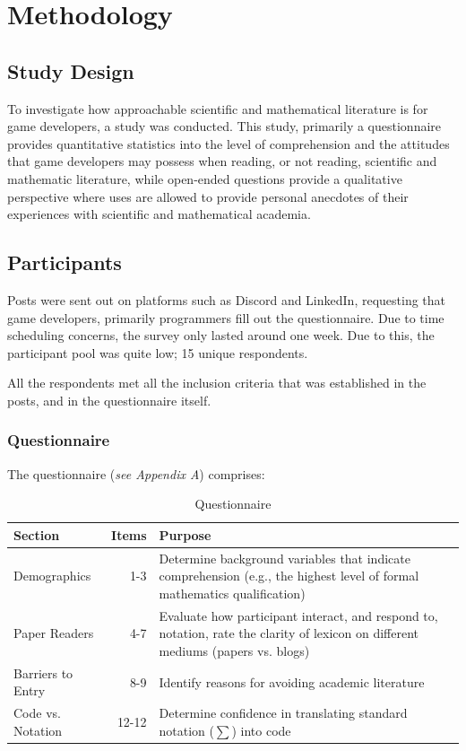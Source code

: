 \chapter{Methodology}

\section{Study Design}

To investigate how approachable scientific and mathematical literature is for game developers, a study was conducted.
This study, primarily a questionnaire provides quantitative statistics into the level of comprehension and the attitudes that game developers
may possess when reading, or not reading, scientific and mathematic literature, while open-ended questions provide a qualitative
perspective where uses are allowed to provide personal anecdotes of their experiences with scientific and mathematical academia.

\section{Participants}

Posts were sent out on platforms such as Discord and LinkedIn, requesting that game developers, primarily programmers fill out the questionnaire.
Due to time scheduling concerns, the survey only lasted around one week. Due to this, the participant pool was quite low; 15 unique respondents.

All the respondents met all the inclusion criteria that was established in the posts, and in the questionnaire itself.

\pagebreak

\subsection{Questionnaire}

The questionnaire (\textit{see Appendix A}) comprises:

\begin{table}[h]
    \centering
    \small
    \renewcommand{\arraystretch}{1.75}
    \caption{Questionnaire}
    \label{tab:questionnaire-short}
        \begin{tabularx}{\textwidth}{@{} l r X @{}}
        \toprule
        \textbf{Section} & \textbf{Items} & \textbf{Purpose} \\ \midrule
        Demographics & 1-3 & Determine background variables that indicate comprehension (e.g., the highest level of formal mathematics qualification) \\
        Paper Readers & 4-7 & Evaluate how participant interact, and respond to, notation, rate the clarity of lexicon on different mediums (papers vs. blogs) \\
        Barriers to Entry & 8-9 & Identify reasons for avoiding academic literature \\
        Code vs. Notation & 12-12 & Determine confidence in translating standard notation ($\sum$) into code \\ \bottomrule
    \end{tabularx}
\end{table}

